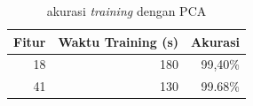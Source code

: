 \FloatBarrier
\begin{table}[h]
\begin{tabular}{|r|r|r|}
\hline
\multicolumn{1}{|l|}{Fitur} & \multicolumn{1}{l|}{Waktu Training (s)} & \multicolumn{1}{l|}{Akurasi} \\  \hline
18                          & 180                                     & 99,40\%                      \\ \hline
41                          & 130                                     & 99.68\%                      \\ \hline
\end{tabular}
\centering
\caption{akurasi \textit{training} dengan PCA}
\end{table}
\FloatBarrier


